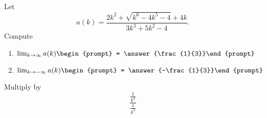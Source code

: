 \documentclass{ximera}
\author{Bart Snapp}
\begin{document}
\begin{exercise}
Let 
\[
a(k) = \frac{2 k^2+\sqrt{k^6-4 k^5-4}+4 k}{3 k^3+5 k^2-4}.
\]
Compute
\begin{enumerate}
\item $\lim_{k\to \infty} a(k) \begin{prompt} = \answer{\frac{1}{3}}\end{prompt}$
\item $\lim_{k\to -\infty}a(k) \begin{prompt} = \answer{-\frac{1}{3}}\end{prompt}$
\end{enumerate}
\begin{hint}
Multiply by
\[
\frac{\frac{1}{k^3}}{\frac{1}{k^3}}
\]
\end{hint}
\end{exercise}
\end{document}

